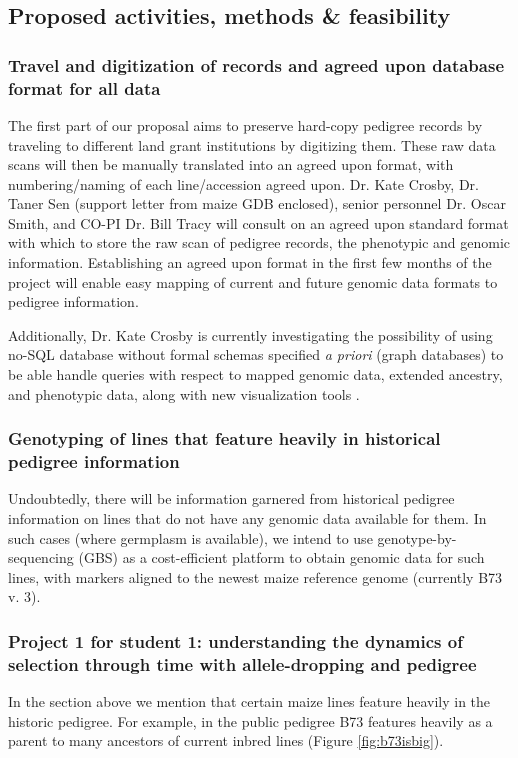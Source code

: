 \documentclass[12pt]{article}
\begin{document}
\subsection*{Proposed activities, methods \& feasibility}
\subsubsection*{Travel and digitization of records and agreed upon database format for all data}
The first part of our proposal aims to preserve hard-copy pedigree records by traveling to different land grant institutions by digitizing them. These raw data scans will then be manually translated into an agreed upon format, with numbering/naming of each line/accession agreed upon.
Dr. Kate Crosby, Dr. Taner Sen (support letter from maize GDB enclosed), senior personnel Dr. Oscar Smith, and CO-PI Dr. Bill Tracy will consult on an agreed upon standard format with which to store the raw scan of pedigree records, the phenotypic and genomic information. Establishing an agreed upon format in the first few months of the project will enable easy mapping of current and future genomic data formats to pedigree information.
\par Additionally, Dr. Kate Crosby is currently investigating the possibility of using no-SQL database without formal schemas specified \textit{a priori} (graph databases) to be able handle queries with respect to mapped genomic data, extended ancestry, and phenotypic data, along with new visualization tools \citep{ParejaTobes:2015bf}.



\subsubsection*{Genotyping of lines that feature heavily in historical pedigree information}
Undoubtedly, there will be information garnered from historical pedigree information on lines that do not have any genomic data available for them. In such cases (where germplasm is available), we intend to use genotype-by-sequencing (GBS) \citep{Elshire:2011ha} as a cost-efficient platform \citep{Glaubitz:2014eu} to obtain genomic data for such lines, with markers aligned to the newest maize reference genome (currently B73 v. 3). 

\subsubsection*{Project 1 for student 1: understanding the dynamics of selection through time with allele-dropping and pedigree}
In the section above we mention that certain maize lines feature heavily in the historic pedigree. For example, in the public pedigree B73 features heavily as a parent to many ancestors of current inbred lines (Figure \ref{fig:b73isbig}). 
\end{document}
